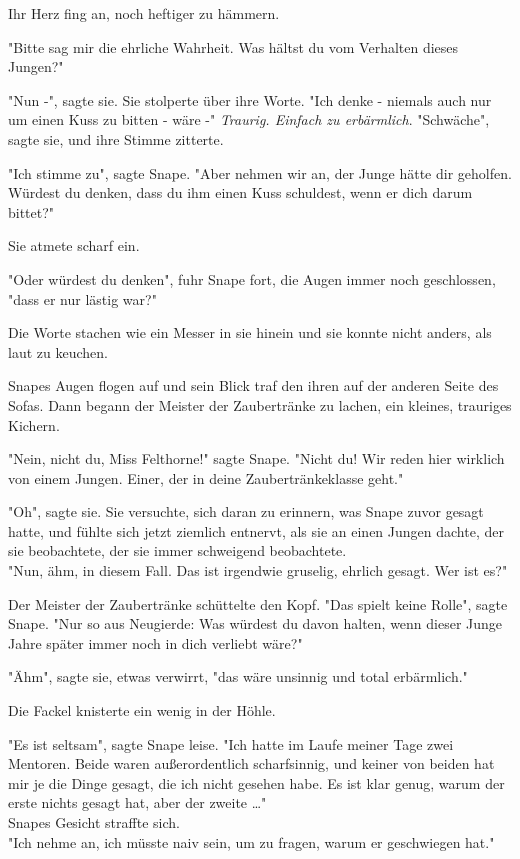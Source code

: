 {Ihr Herz fing an, noch heftiger zu hämmern.

"Bitte sag mir die ehrliche Wahrheit. Was hältst du vom Verhalten dieses Jungen?"

"Nun -", sagte sie. Sie stolperte über ihre Worte. "Ich denke - niemals auch nur um einen Kuss zu bitten - wäre -" \emph{Traurig. Einfach zu erbärmlich}. "Schwäche", sagte sie, und ihre Stimme zitterte.

"Ich stimme zu", sagte Snape. "Aber nehmen wir an, der Junge hätte dir geholfen. Würdest du denken, dass du ihm einen Kuss schuldest, wenn er dich darum bittet?"

Sie atmete scharf ein.

"Oder würdest du denken", fuhr Snape fort, die Augen immer noch geschlossen, "dass er nur lästig war?"

Die Worte stachen wie ein Messer in sie hinein und sie konnte nicht anders, als laut zu keuchen.

Snapes Augen flogen auf und sein Blick traf den ihren auf der anderen Seite des Sofas. Dann begann der Meister der Zaubertränke zu lachen, ein kleines, trauriges Kichern.

"Nein, nicht du, Miss Felthorne!" sagte Snape. "Nicht du! Wir reden hier wirklich von einem Jungen. Einer, der in deine Zaubertränkeklasse geht."

"Oh", sagte sie. Sie versuchte, sich daran zu erinnern, was Snape zuvor gesagt hatte, und fühlte sich jetzt ziemlich entnervt, als sie an einen Jungen dachte, der sie beobachtete, der sie immer schweigend beobachtete.\\ "Nun, ähm, in diesem Fall. Das ist irgendwie gruselig, ehrlich gesagt. Wer ist es?"

Der Meister der Zaubertränke schüttelte den Kopf. "Das spielt keine Rolle", sagte Snape. "Nur so aus Neugierde: Was würdest du davon halten, wenn dieser Junge Jahre später immer noch in dich verliebt wäre?"

"Ähm", sagte sie, etwas verwirrt, "das wäre unsinnig und total erbärmlich."

Die Fackel knisterte ein wenig in der Höhle.

"Es ist seltsam", sagte Snape leise. "Ich hatte im Laufe meiner Tage zwei Mentoren. Beide waren außerordentlich scharfsinnig, und keiner von beiden hat mir je die Dinge gesagt, die ich nicht gesehen habe. Es ist klar genug, warum der erste nichts gesagt hat, aber der zweite …"\\ Snapes Gesicht straffte sich.\\ "Ich nehme an, ich müsste naiv sein, um zu fragen, warum er geschwiegen hat."

}
